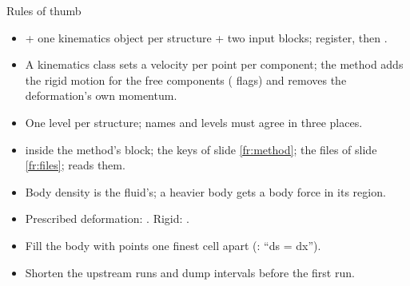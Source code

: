 \documentclass[aspectratio=169,11pt]{beamer}
\begin{document}
\begin{frame}{Rules of thumb}
\label{fr:thumb}
\small
\begin{itemize}
  \item {} + one kinematics object per structure + two input blocks; register, then .
  \item A kinematics class sets a velocity per point per component; the method adds the rigid motion for the free components ( flags) and removes the deformation's own momentum.
  \item One level per structure; names and levels must agree in three places.
  \item {} inside the method's block; the keys of slide \ref{fr:method}; the files of slide \ref{fr:files};  reads them.
  \item Body density is the fluid's; a heavier body gets a body force in its region.
  \item Prescribed deformation: . Rigid: .
  \item Fill the body with points one finest cell apart (: ``ds = dx'').
  \item Shorten the upstream runs and dump intervals before the first run.
\end{itemize}
\end{frame}
\end{document}
